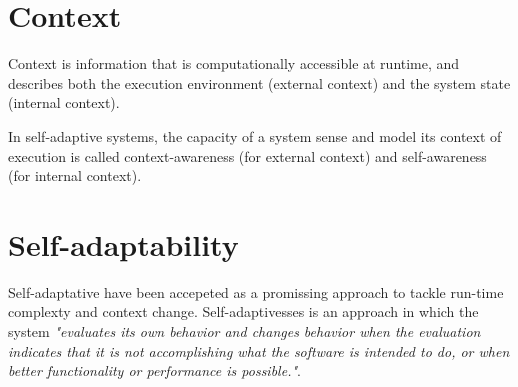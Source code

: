 \section{Context}

Context is information that is computationally accessible at runtime,  and describes both the execution environment (external context) and the system state (internal context).

In self-adaptive systems, the capacity of a system sense and model its context of execution is called context-awareness (for external context) and self-awareness (for internal context).

\section{Self-adaptability}

Self-adaptative have been accepeted as a promissing approach to tackle run-time
complexty and context change. Self-adaptivesses is an approach in which the system
\textit{"evaluates its own behavior and changes behavior when the evaluation indicates that it is not accomplishing what the software is intended to do, or when better functionality or performance is possible."}\cite{laddaga1997}.









